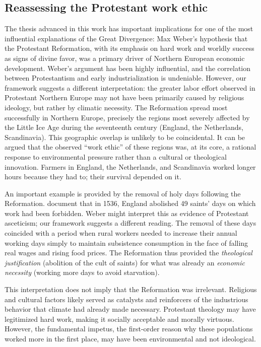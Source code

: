 \documentclass[11pt,a4paper]{article}
\begin{document}
\subsection*{Reassessing the Protestant work ethic}
The thesis advanced in this work has important implications for one of the most influential explanations of the Great Divergence: Max Weber's hypothesis that the Protestant Reformation, with its emphasis on hard work and worldly success as signs of divine favor, was a primary driver of Northern European economic development.
Weber's argument has been highly influential, and the correlation between Protestantism and early industrialization is undeniable. However, our framework suggests a different interpretation: the greater labor effort observed in Protestant Northern Europe may not have been primarily caused by religious ideology, but rather by climatic necessity.
The Reformation spread most successfully in Northern Europe, precisely the regions most severely affected by the Little Ice Age during the seventeenth century (England, the Netherlands, Scandinavia). This geographic overlap is unlikely to be coincidental. It can be argued that the observed ``work ethic'' of these regions was, at its core, a rational response to environmental pressure rather than a cultural or theological innovation. Farmers in England, the Netherlands, and Scandinavia worked longer hours because they had to; their survival depended on it.

An important example is provided by the removal of holy days following the Reformation. \textcite{AllenWeisdorf2011} document that in 1536, England abolished 49 saints' days on which work had been forbidden. Weber might interpret this as evidence of Protestant asceticism; our framework suggests a different reading. The removal of these days coincided with a period when rural workers needed to increase their annual working days simply to maintain subsistence consumption in the face of falling real wages and rising food prices. The Reformation thus provided the \textit{theological justification} (abolition of the cult of saints) for what was already an \textit{economic necessity} (working more days to avoid starvation).

This interpretation does not imply that the Reformation was irrelevant. Religious and cultural factors likely served as catalysts and reinforcers of the industrious behavior that climate had already made necessary. Protestant theology may have legitimized hard work, making it socially acceptable and morally virtuous. However, the fundamental impetus, the first-order reason why these populations worked more in the first place, may have been environmental and not ideological.
\end{document}
